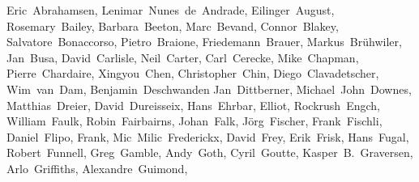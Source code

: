 \begin{flushleft}
  \small
  Eric~Abrahamsen,        %
  Lenimar~Nunes~de~Andrade, %
  Eilinger~August,        %
  Rosemary~Bailey,        %
  Barbara~Beeton,         %
  Marc~Bevand,            %
  Connor~Blakey,          %
  Salvatore~Bonaccorso,   %
  Pietro~Braione,         %
  Friedemann~Brauer,      %
  Markus~Br\"uhwiler,     %
  Jan~Busa,               %
  David~Carlisle,         %
  Neil~Carter,            %
  Carl~Cerecke,           %
  Mike~Chapman,           %
  Pierre~Chardaire,       %
  Xingyou~Chen,           %
  Christopher~Chin,       %
  Diego~Clavadetscher,    %
  Wim~van~Dam,            %
  Benjamin~Deschwanden    %
  Jan~Dittberner,         %
  Michael~John~Downes,    %
  Matthias~Dreier,        %
  David~Dureisseix,       %
  Hans~Ehrbar,            %
  Elliot,                 %
  Rockrush~Engch,         %
  William~Faulk,          %
  Robin~Fairbairns,       %
  Johan~Falk,             %
  J\"org~Fischer,         %
  Frank~Fischli,          %
  Daniel~Flipo,           %
  Frank,                  %
  Mic~Milic~Frederickx,   %
  David~Frey,             %
  Erik~Frisk,             %
  Hans~Fugal,             %
  Robert~Funnell,         %
  Greg~Gamble,            %
  Andy~Goth,              %
  Cyril~Goutte,           %
  Kasper~B.~Graversen,    %
  Arlo~Griffiths,         %
  Alexandre~Guimond,      %

\end{flushleft}

